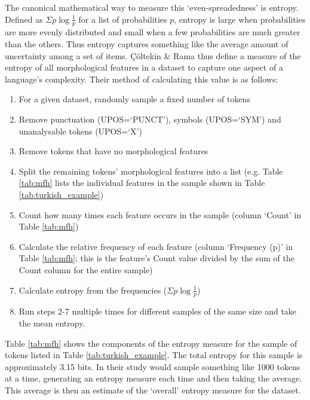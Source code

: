 \documentclass[USenglish]{article}
\begin{document}
The canonical mathematical way to measure this `even-spreadedness' is entropy.
Defined as $\Sigma p \log{\frac{1}{p}}$ for a list of probabilities $p$, entropy is large when probabilities are more evenly distributed and small when a few probabilities are much greater than the others.
Thus entropy captures something like the average amount of uncertainty among a set of items.
Çöltekin \& Rama thus define a measure of the entropy of all morphological features in a dataset to capture one aspect of a language's complexity.
Their method of calculating this value is as follows:
\begin{enumerate}
\item For a given dataset, randomly sample a fixed number of tokens
\item Remove punctuation (UPOS=`PUNCT'), symbols (UPOS=`SYM') and unanalysable tokens (UPOS=`X')
\item Remove tokens that have no morphological features
\item Split the remaining tokens' morphological features into a list (e.g. Table \ref{tab:mfh} lists the individual features in the sample shown in Table \ref{tab:turkish_example})
\item Count how many times each feature occurs in the sample (column `Count' in Table \ref{tab:mfh})
\item Calculate the relative frequency of each feature (column `Frequency (p)' in Table \ref{tab:mfh}; this is the feature's Count value divided by the sum of the Count column for the entire sample)
\item Calculate entropy from the frequencies ($\Sigma p \log{\frac{1}{p}}$)
\item Run steps 2-7 multiple times for different samples of the same size and take the mean entropy.
\end{enumerate}

\noindent Table \ref{tab:mfh} shows the components of the entropy measure for the sample of tokens listed in Table \ref{tab:turkish_example}.
The total entropy for this sample is approximately 3.15 bits.
In their study \citet{ccoltekin2023complexity} would sample something like 1000 tokens at a time, generating an entropy measure each time and then taking the average.
This average is then an estimate of the `overall' entropy measure for the dataset.
\end{document}
